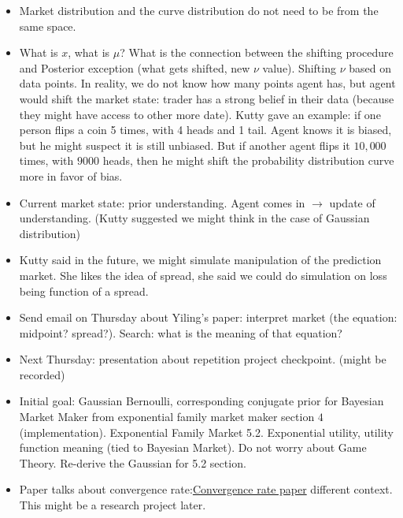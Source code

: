 \documentclass{article}
\begin{document}
\begin{itemize}
\item Market distribution and the curve distribution do not need to be from the same space.

\item What is $x$, what is $\mu$? What is the connection between the shifting procedure and Posterior exception (what gets shifted, new $\nu$ value). Shifting $\nu$ based on data points. In reality, we do not know how many points agent has, but agent would shift the market state: trader has a strong belief in their data (because they might have access to other more date). Kutty gave an example: if one person flips a coin 5 times, with 4 heads and 1 tail. Agent knows it is biased, but he might suspect it is still unbiased. But if another agent flips it $10,000$ times, with $9000$ heads, then he might shift the probability distribution curve more in favor of bias. 
\item Current market state: prior understanding. Agent comes in $\rightarrow$ update of understanding. (Kutty suggested we might think in the case of Gaussian distribution)
\item Kutty said in the future, we might simulate manipulation of the prediction market. She likes the idea of spread, she said we could do simulation on loss being function of a spread.

\item Send email on Thursday about Yiling's paper: interpret market (the equation: midpoint? spread?). Search: what is the meaning of that equation?
\item Next Thursday: presentation about repetition project checkpoint. (might be recorded)
\item Initial goal: Gaussian Bernoulli, corresponding conjugate prior for Bayesian Market Maker from exponential family market maker section $4$ (implementation). Exponential Family Market 5.2. Exponential utility, utility function meaning (tied to Bayesian Market). Do not worry about Game Theory. Re-derive the Gaussian for 5.2 section.
\item Paper talks about convergence rate:\href{https://www.cs.colorado.edu/~raf/media/papers/risknets.pdf}{Convergence rate paper} different context. This might be a research project later.
\end{itemize}
\end{document}
